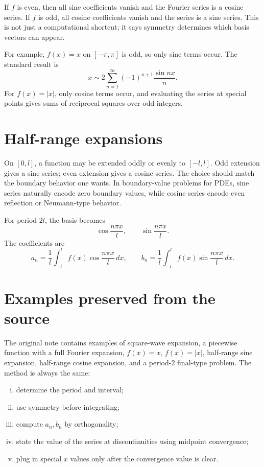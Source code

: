 If $f$ is even, then all sine coefficients vanish and the Fourier series is a cosine series.  If $f$ is odd, all cosine coefficients vanish and the series is a sine series.  This is not just a computational shortcut; it says symmetry determines which basis vectors can appear.

For example, $f(x)=x$ on $[-\pi,\pi]$ is odd, so only sine terms occur.  The standard result is
\[
  x\sim 2\sum_{n=1}^{\infty}(-1)^{n+1}\frac{\sin nx}{n}.
\]
For $f(x)=|x|$, only cosine terms occur, and evaluating the series at special points gives sums of reciprocal squares over odd integers.

\section{Half-range expansions}

On $[0,l]$, a function may be extended oddly or evenly to $[-l,l]$.  Odd extension gives a sine series; even extension gives a cosine series.  The choice should match the boundary behavior one wants.  In boundary-value problems for PDEs, sine series naturally encode zero boundary values, while cosine series encode even reflection or Neumann-type behavior.

For period $2l$, the basis becomes
\[
  \cos \frac{n\pi x}{l},\qquad \sin \frac{n\pi x}{l}.
\]
The coefficients are
\[
  a_n=\frac1l\int_{-l}^{l}f(x)\cos\frac{n\pi x}{l}\,dx,\qquad
  b_n=\frac1l\int_{-l}^{l}f(x)\sin\frac{n\pi x}{l}\,dx.
\]

\section{Examples preserved from the source}

The original note contains examples of square-wave expansion, a piecewise function with a full Fourier expansion, $f(x)=x$, $f(x)=|x|$, half-range sine expansion, half-range cosine expansion, and a period-$2$ final-type problem.  The method is always the same:

\begin{enumerate}[(i)]
  \item determine the period and interval;
  \item use symmetry before integrating;
  \item compute $a_n,b_n$ by orthogonality;
  \item state the value of the series at discontinuities using midpoint convergence;
  \item plug in special $x$ values only after the convergence value is clear.
\end{enumerate}

